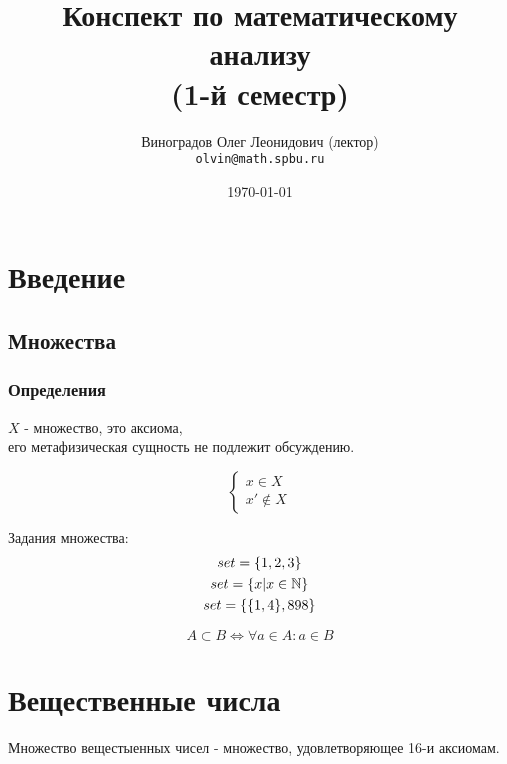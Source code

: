 \documentclass[12pt, a4paper]{article}
\title{Конспект по математическому анализу \\(1-й семестр)}
\author{
  \vova
  \and
  Виноградов Олег Леонидович (лектор)\\
  \texttt{olvin@math.spbu.ru}
}
\date{\today}
\begin{document}
  \maketitle
  \newpage
  \tableofcontents
  \newpage


  \section{Введение}


  \subsection{Множества}


  \subsubsection{Определения} 

  \begin{definition}[Множество]
  $X$ - множество, это аксиома, \\
  его метафизическая сущность не подлежит обсуждению.  
  \end{definition}

  \begin{equation}
  \begin{cases}
    x \in X \\
    x' \notin X
  \end{cases}
  \end{equation}

  \begin{example}
  Задания множества: 
  \begin{gather}
    set = \{1, 2, 3\} \\
    set = \{x | x \in {\mathbb{N}}\} \\
    set = \{\{1, 4\}, 898\}
  \end{gather}
  \end{example}

  \begin{definition}[Подмножество]
  \begin{equation}
    A \subset B \Longleftrightarrow \forall a \in A: a \in B
  \end{equation}
  \end{definition}

  \section{Вещественные числа}
  Множество вещестыенных чисел - множество, 
  удовлетворяющее 16-и аксиомам.
\end{document}
